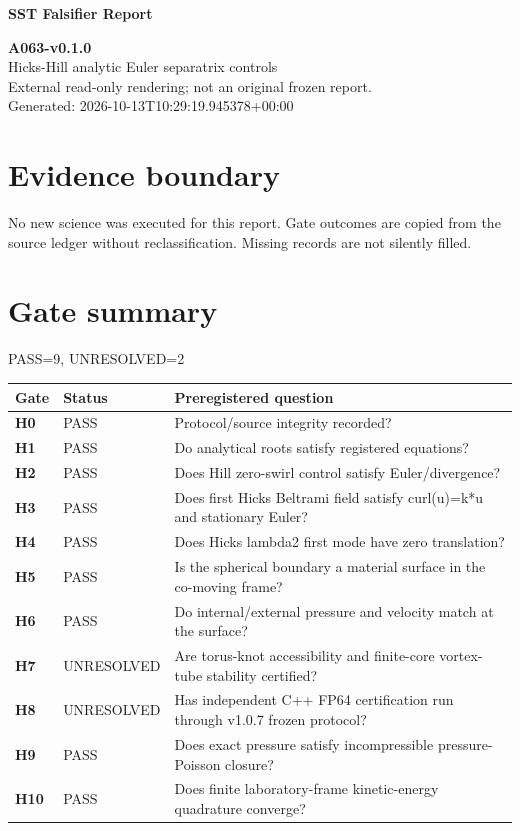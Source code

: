 \documentclass[10pt,a4paper]{article}
\begin{document}
\color{navy}\Huge\bfseries SST Falsifier Report\par\normalsize\mdseries\color{black}
\textbf{A063-v0.1.0}\\
Hicks-Hill analytic Euler separatrix controls\\
External read-only rendering; not an original frozen report.\\
Generated: 2026-10-13T10:29:19.945378+00:00\\
\section*{Evidence boundary}
No new science was executed for this report. Gate outcomes are copied from the source ledger without reclassification. Missing records are not silently filled.
\section*{Gate summary}
PASS=9, UNRESOLVED=2
\begin{longtable}{p{13mm}p{24mm}p{119mm}}
\toprule Gate & Status & Preregistered question \\
\midrule\endhead
\textbf{H0} & PASS & Protocol/source integrity recorded?\\\hline
\textbf{H1} & PASS & Do analytical roots satisfy registered equations?\\\hline
\textbf{H2} & PASS & Does Hill zero-swirl control satisfy Euler/divergence?\\\hline
\textbf{H3} & PASS & Does first Hicks Beltrami field satisfy curl(u)=k*u and stationary Euler?\\\hline
\textbf{H4} & PASS & Does Hicks lambda2 first mode have zero translation?\\\hline
\textbf{H5} & PASS & Is the spherical boundary a material surface in the co-moving frame?\\\hline
\textbf{H6} & PASS & Do internal/external pressure and velocity match at the surface?\\\hline
\textbf{H7} & UNRESOLVED & Are torus-knot accessibility and finite-core vortex-tube stability certified?\\\hline
\textbf{H8} & UNRESOLVED & Has independent C++ FP64 certification run through v1.0.7 frozen protocol?\\\hline
\textbf{H9} & PASS & Does exact pressure satisfy incompressible pressure-Poisson closure?\\\hline
\textbf{H10} & PASS & Does finite laboratory-frame kinetic-energy quadrature converge?\\\hline
\bottomrule\end{longtable}
\end{document}
